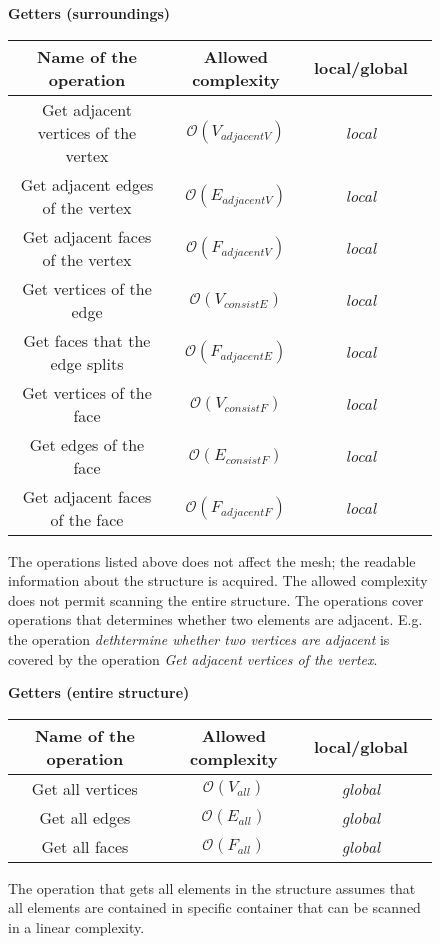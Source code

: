 \begin{figure}[!htbp]

\centering
\textbf{Getters (surroundings)}\\
\vspace{2mm}
\begin{tabular}{| c | c | c | c |}
\hline
\textbf{Name of the operation} & \textbf{Allowed complexity} & \textbf{local/global}\\
\hline
Get adjacent vertices of the vertex& $\mathcal{O}(V_{adjacentV})$ & \emph{local}\\
\hline
Get adjacent edges of the vertex& $\mathcal{O}(E_{adjacentV})$ & \emph{local}\\
\hline
Get adjacent faces of the vertex& $\mathcal{O}(F_{adjacentV})$ & \emph{local}\\
\hline
Get vertices of the edge& $\mathcal{O}(V_{consistE})$ & \emph{local}\\
\hline
Get faces that the edge splits& $\mathcal{O}(F_{adjacentE})$ & \emph{local}\\
\hline
Get vertices of the face& $\mathcal{O}(V_{consistF})$ & \emph{local}\\
\hline
Get edges of the face& $\mathcal{O}(E_{consistF})$ & \emph{local}\\
\hline
Get adjacent faces of the face& $\mathcal{O}(F_{adjacentF})$ & \emph{local}\\
\hline
\end{tabular}
\caption{The operations listed above does not affect the mesh; the readable information about the
structure is acquired. The allowed complexity does not permit scanning the entire structure.
The operations cover operations that determines whether two elements are adjacent.
E.g. the operation \emph{dethtermine whether two vertices are adjacent} is covered by the
operation \emph{Get adjacent vertices of the vertex}.
}
\end{figure}

\begin{figure}[!htbp]
\centering
\textbf{Getters (entire structure)}\\
\vspace{2mm}
\begin{tabular}{| c | c | c | c |}
\hline
\textbf{Name of the operation} & \textbf{Allowed complexity} & \textbf{local/global}\\
\hline
Get all vertices & $\mathcal{O}(V_{all})$ & \emph{global}\\
\hline
Get all edges & $\mathcal{O}(E_{all})$ & \emph{global}\\
\hline
Get all faces & $\mathcal{O}(F_{all})$ & \emph{global}\\
\hline
\end{tabular}
\caption{The operation that gets all elements in the structure assumes that all elements are contained
in specific container that can be scanned in a linear complexity.}
\end{figure}